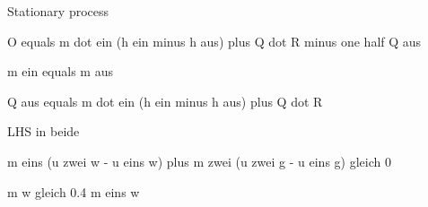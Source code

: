 Stationary process

O equals m dot ein (h ein minus h aus) plus Q dot R minus one half Q aus

m ein equals m aus

Q aus equals m dot ein (h ein minus h aus) plus Q dot R

LHS in beide

m eins (u zwei w - u eins w) plus m zwei (u zwei g - u eins g) gleich 0

m w gleich 0.4 m eins w